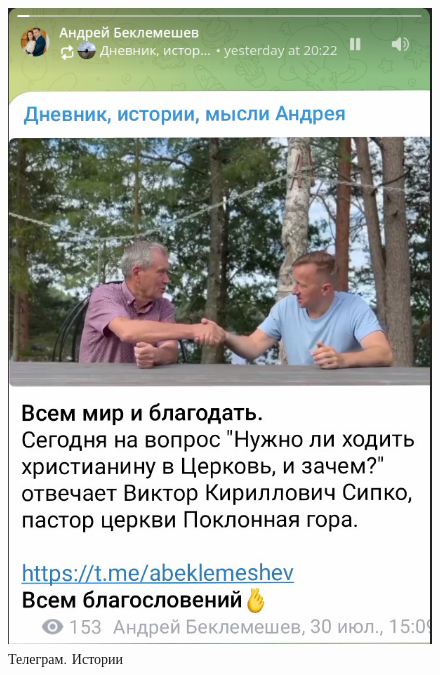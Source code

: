 \documentclass[t,aspectratio=169,14pt]{beamer}  %
\begin{document}
\begin{frame}[c]
\begin{multicols*}{2}
{		\begin{figure}[h]
			 \includegraphics[height=0.63\textheight]{telegram-story.jpg}
			\centering
			\caption{Телеграм. Истории}
		\end{figure}		
		}


\end{multicols*}
\end{frame}
\end{document}
